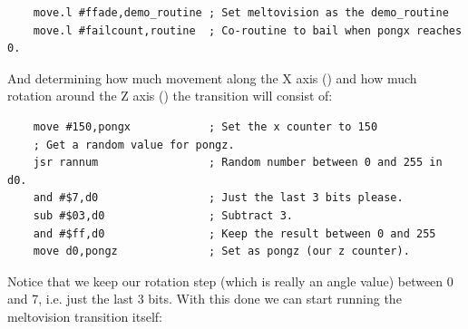 \begin{lstlisting}
    move.l #ffade,demo_routine ; Set meltovision as the demo_routine
    move.l #failcount,routine  ; Co-routine to bail when pongx reaches 0.
\end{lstlisting}
And determining how much movement along the X axis () and how much rotation around the Z
axis () the transition will consist of:
\begin{lstlisting}
    move #150,pongx            ; Set the x counter to 150
    ; Get a random value for pongz.
    jsr rannum                 ; Random number between 0 and 255 in d0.
    and #$7,d0                 ; Just the last 3 bits please.
    sub #$03,d0                ; Subtract 3.
    and #$ff,d0                ; Keep the result between 0 and 255
    move d0,pongz              ; Set as pongz (our z counter).
\end{lstlisting}

Notice that we keep our rotation step (which is really an angle value) between 0 and 7, i.e. just
the last 3 bits.
With this done we can start running the meltovision transition itself:

